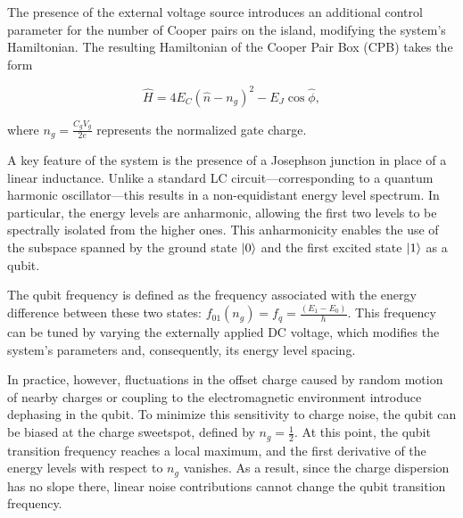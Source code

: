 The presence of the external voltage source introduces an additional control parameter for the number of Cooper pairs on the island, modifying the system's Hamiltonian. 
The resulting Hamiltonian of the Cooper Pair Box (CPB) takes the form

\begin{equation}\label{eq:CPB_complete}
    \hat{H} = 4E_C(\hat{n} - n_g)^2 - E_J \cos{\hat{\phi}},
\end{equation}

where $n_g = \frac{C_g V_g}{2e}$ represents the normalized gate charge.

A key feature of the system is the presence of a Josephson junction in place of a linear inductance. 
Unlike a standard LC circuit—corresponding to a quantum harmonic oscillator—this results in a non-equidistant energy level spectrum. 
In particular, the energy levels are anharmonic, allowing the first two levels to be spectrally isolated from the higher ones. 
This anharmonicity enables the use of the subspace spanned by the ground state $\ket{0}$ and the first excited state $\ket{1}$ as a qubit.

The qubit frequency is defined as the frequency associated with the energy difference between these two states: $f_{01}(n_g) = f_q = \frac{(E_1 - E_0)}{h}$.
This frequency can be tuned by varying the externally applied DC voltage, which modifies the system’s parameters and, consequently, its energy level spacing.

In practice, however, fluctuations in the offset charge caused by random motion of nearby charges or coupling to the electromagnetic environment introduce dephasing in the qubit. 
To minimize this sensitivity to charge noise, the qubit can be biased at the charge sweetspot, defined by $n_g=\frac{1}{2}$.
At this point, the qubit transition frequency reaches a local maximum, and the first derivative of the energy levels with respect to $n_g$ vanishes.
As a result, since the charge dispersion has no slope there, linear noise contributions cannot change the qubit transition frequency.


